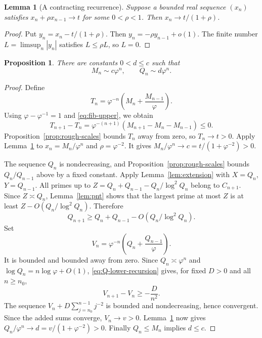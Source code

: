 \documentclass[11pt,letterpaper]{article}
\numberwithin{equation}{section}
\newtheorem{lemma}[theorem]{Lemma}
\newtheorem{proposition}[theorem]{Proposition}
\theoremstyle{remark}
\newcommand{\ph}{\varphi}
\begin{document}
\begin{lemma}[A contracting recurrence]\label{lem:contraction}
Suppose a bounded real sequence $(x_n)$ satisfies
$x_n+\rho x_{n-1}\to t$ for some $0<\rho<1$.
Then $x_n\to t/(1+\rho)$.
\end{lemma}

\begin{proof}
Put $y_n=x_n-t/(1+\rho)$. Then $y_n=-\rho y_{n-1}+o(1)$.
The finite number $L=\limsup_n|y_n|$ satisfies $L\le\rho L$,
so $L=0$.
\end{proof}

\begin{proposition}\label{prop:constants}
There are constants $0<d\le c$ such that
\begin{equation}\label{eq:constants}
 M_n\sim c\ph^n,\qquad Q_n\sim d\ph^n.
\end{equation}
\end{proposition}

\begin{proof}
Define
\[
 T_n=\ph^{-n}\left(M_n+\frac{M_{n-1}}\ph\right).
\]
Using $\ph-\ph^{-1}=1$ and \eqref{eq:fib-upper}, we obtain
\[
 T_{n+1}-T_n
 =\ph^{-(n+1)}(M_{n+1}-M_n-M_{n-1})\le0.
\]
Proposition~\ref{prop:rough-scales} bounds $T_n$ away from zero,
so $T_n\to t>0$. Apply Lemma~\ref{lem:contraction} to
$x_n=M_n/\ph^n$ and $\rho=\ph^{-2}$. It gives
$M_n/\ph^n\to c=t/(1+\ph^{-2})>0$.

The sequence $Q_n$ is nondecreasing, and
Proposition~\ref{prop:rough-scales} bounds $Q_n/Q_{n-1}$ above by
a fixed constant. Apply Lemma~\ref{lem:extension} with
$X=Q_n$, $Y=Q_{n-1}$. All primes up to
$Z=Q_n+Q_{n-1}-Q_n/\log^2Q_n$ belong to $C_{n+1}$.
Since $Z\asymp Q_n$, Lemma~\ref{lem:pnt} shows that the largest
prime at most $Z$ is at least $Z-O(Q_n/\log^2Q_n)$. Therefore
\begin{equation}\label{eq:Q-lower-recursion}
 Q_{n+1}\ge Q_n+Q_{n-1}-O(Q_n/\log^2Q_n).
\end{equation}
Set
\[
 V_n=\ph^{-n}\left(Q_n+\frac{Q_{n-1}}\ph\right).
\]
It is bounded and bounded away from zero. Since
$Q_n\asymp\ph^n$ and $\log Q_n=n\log\ph+O(1)$,
\eqref{eq:Q-lower-recursion} gives, for fixed $D>0$ and all $n\ge n_0$,
\[
 V_{n+1}-V_n\ge-\frac{D}{n^2}.
\]
The sequence $V_n+D\sum_{j=n_0}^{n-1}j^{-2}$ is bounded and
nondecreasing, hence convergent. Since the added sums converge,
$V_n\to v>0$. Lemma~\ref{lem:contraction} now gives
$Q_n/\ph^n\to d=v/(1+\ph^{-2})>0$. Finally $Q_n\le M_n$
implies $d\le c$.
\end{proof}
\end{document}
